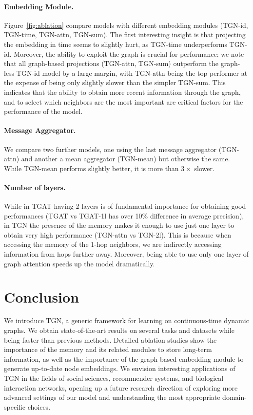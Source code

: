 \documentclass{article}
\begin{document}
\paragraph{Embedding Module.} Figure~\ref{fig:ablation} compare models with different embedding modules (TGN-id, TGN-time, TGN-attn, TGN-sum). The first interesting insight is that projecting the embedding in time seems to slightly hurt, as TGN-time underperforms TGN-id. Moreover, the ability to exploit the graph is crucial for performance:  we note that all graph-based projections (TGN-attn, TGN-sum) outperform the graph-less TGN-id model by a large margin, with TGN-attn being the top performer at the expense of being only slightly slower than the simpler TGN-sum. This indicates that the ability to obtain more recent information through the graph, and to select which neighbors are the most important are critical factors for the performance of the model.

\paragraph{Message Aggregator.} We compare two further models, one using the last message aggregator (TGN-attn) and another a mean aggregator (TGN-mean) but otherwise the same. While TGN-mean performs slightly better, it is more than $3\times$ slower.  

\paragraph{Number of layers.} While in TGAT having 2 layers is of fundamental importance for obtaining good performances (TGAT vs TGAT-1l has over 10\% difference in average precision), in TGN the presence of the memory makes it enough to use just one layer to obtain very high performance (TGN-attn vs TGN-2l). This is because when accessing the memory of the 1-hop neighbors, we are indirectly accessing information from hops further away. Moreover, being able to use only one layer of graph attention speeds up the model dramatically.

\section{Conclusion}
We introduce TGN,  a generic framework for learning on continuous-time dynamic graphs. We obtain state-of-the-art results on several tasks and datasets while being faster than previous methods. Detailed ablation studies show the importance of the memory and its related modules to store long-term information, as well as the importance of the graph-based embedding module to generate up-to-date node embeddings. We envision interesting applications of TGN in the fields of social sciences, recommender systems, and biological interaction networks, opening up a future research direction of exploring more advanced settings of our model and understanding the most appropriate domain-specific choices.
\end{document}
